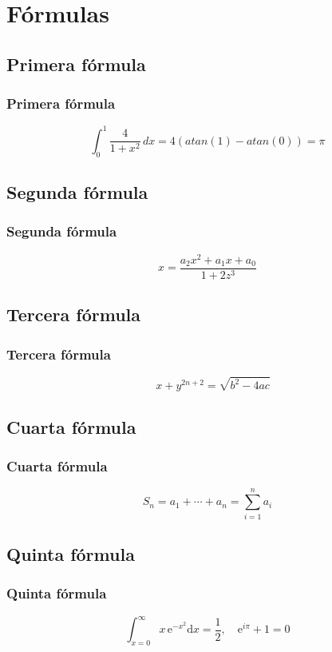 \documentclass{beamer}
\begin{document}
\section{Fórmulas}
\subsection{Primera fórmula}
\begin{frame}
\frametitle{Primera fórmula}
$$\int_{0}^{1} \! \frac{4}{1+x^2}\, dx = 4(atan(1) -atan(0)) = \pi $$

\end{frame}

\subsection{Segunda fórmula}
\begin{frame}
\frametitle{Segunda fórmula}

\[x=\frac{a_2 x ^ 2 + a_1 x + a_0}{1+2z ^ 3}\]
\end{frame}


\subsection{Tercera fórmula}
\begin{frame}
\frametitle{Tercera fórmula}

\[\quad x+y ^ {2n+2}=\sqrt{b ^ 2-4ac}\]
\end{frame}


\subsection{Cuarta fórmula}
\begin{frame}
\frametitle{Cuarta fórmula}
\[ S_n=a_1+\cdots + a_n = \sum_{i=1} ^ n a_i \]

\end{frame}


\subsection{Quinta fórmula}
\begin{frame}
\frametitle{Quinta fórmula}
\[\int_{x=0} ^ {\infty} x\, \text{e} ^ {-x ^ 2} \text{d}x=\frac{1}{2}, \quad\text{e} ^ {i\pi}+1=0\]

\end{frame}
\end{document}
